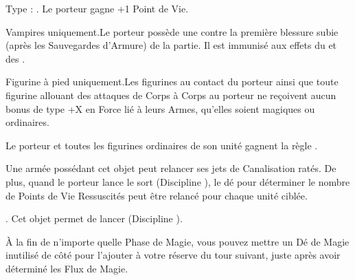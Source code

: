 \endpricelist

\armymagicalarmour

\startpricelist

 Type : \platearmour{}. Le porteur gagne +1 Point de Vie.

\endpricelist

\armytalismans

\startpricelist

 Vampires uniquement.\newline Le porteur possède une  contre la première blessure subie (après les Sauvegardes d'Armure) de la partie. Il est immunisé aux effets du  et des \multiplewounds{}{}.

 Figurine à pied uniquement.\newline Les figurines au contact du porteur ainsi que toute figurine allouant des attaques de Corps à Corps au porteur ne reçoivent aucun bonus de type +X en Force lié à leurs Armes, qu'elles soient magiques ou ordinaires.

\endpricelist

\armyenchanteditems

\startpricelist

 Le porteur et toutes les figurines ordinaires de son unité gagnent la règle \distracting{}.

\endpricelist

\armyarcaneitems

\startpricelist

 Une armée possédant cet objet peut relancer ses jets de Canalisation ratés. De plus, quand le porteur lance le sort \necromancysignaturespell{} (Discipline \necromancy{}), le dé pour déterminer le nombre de Points de Vie Ressuscités peut être relancé pour chaque unité ciblée.

 . Cet objet permet de lancer \necromancyspelltwo{} (Discipline \necromancy{}).

 À la fin de n'importe quelle Phase de Magie, vous pouvez mettre un Dé de Magie inutilisé de côté pour l'ajouter à votre réserve du tour suivant, juste après avoir déterminé les Flux de Magie.

\endpricelist

\armymagicalbanners

